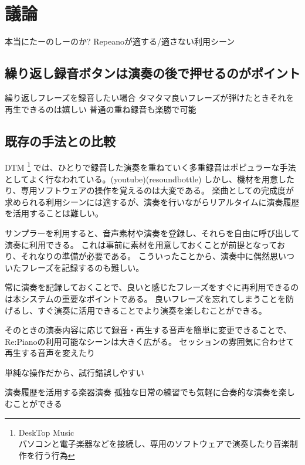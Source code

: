\section{議論}

本当にたーのしーのか?
Repeanoが適する/適さない利用シーン
\subsection{繰り返し録音ボタンは演奏の後で押せるのがポイント}
繰り返しフレーズを録音したい場合
タマタマ良いフレーズが弾けたときそれを再生できるのは嬉しい
普通の重ね録音も楽勝で可能

\subsection{既存の手法との比較}


DTM
\footnote{\textsf{DeskTop Music\\パソコンと電子楽器などを接続し、専用のソフトウェアで演奏したり音楽制作を行う行為}}
では、ひとりで録音した演奏を重ねていく多重録音はポピュラーな手法としてよく行なわれている。(youtube)(resoundbottle)
しかし、機材を用意したり、専用ソフトウェアの操作を覚えるのは大変である。
楽曲としての完成度が求められる利用シーンには適するが、演奏を行いながらリアルタイムに演奏履歴を活用することは難しい。

サンプラーを利用すると、音声素材や演奏を登録し、それらを自由に呼び出して演奏に利用できる。
これは事前に素材を用意しておくことが前提となっており、それなりの準備が必要である。
こういったことから、演奏中に偶然思いついたフレーズを記録するのも難しい。

常に演奏を記録しておくことで、良いと感じたフレーズをすぐに再利用できるのは本システムの重要なポイントである。
良いフレーズを忘れてしまうことを防げるし、すぐ演奏に活用できることでより演奏を楽しむことができる。

そのときの演奏内容に応じて録音・再生する音声を簡単に変更できることで、Re:Pianoの利用可能なシーンは大きく広がる。
セッションの雰囲気に合わせて再生する音声を変えたり

単純な操作だから、試行錯誤しやすい

演奏履歴を活用する楽器演奏
孤独な日常の練習でも気軽に合奏的な演奏を楽しむことができる

